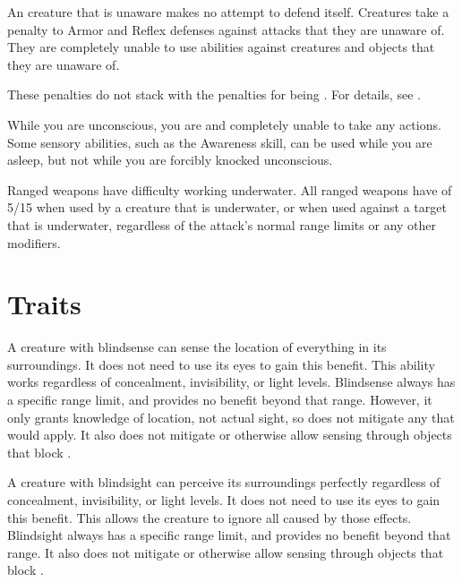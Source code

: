   An creature that is unaware makes no attempt to defend itself.
  Creatures take a  penalty to Armor and Reflex defenses against attacks that they are unaware of.
  They are completely unable to use  abilities against creatures and objects that they are unaware of.

  These penalties do not stack with the penalties for being \partiallyunaware.
  For details, see .

   While you are unconscious, you are \helpless and completely unable to take any actions.
  Some sensory abilities, such as the Awareness skill, can be used while you are asleep, but not while you are forcibly knocked unconscious.

   Ranged weapons have difficulty working underwater.
  All ranged weapons have  of 5/15 when used by a creature that is underwater, or when used against a target that is underwater, regardless of the attack's normal range limits or any other modifiers.

  \newpage
\section{Traits}\label{Traits}

  A creature with blindsense can sense the location of everything in its surroundings.
  It does not need to use its eyes to gain this benefit.
  This ability works regardless of concealment, invisibility, or light levels.
  Blindsense always has a specific range limit, and provides no benefit beyond that range.
  However, it only grants knowledge of location, not actual sight, so does not mitigate any  that would apply.
  It also does not mitigate  or otherwise allow sensing through objects that block .

  A creature with blindsight can perceive its surroundings perfectly regardless of concealment, invisibility, or light levels.
  It does not need to use its eyes to gain this benefit.
  This allows the creature to ignore all  caused by those effects.
  Blindsight always has a specific range limit, and provides no benefit beyond that range.
  It also does not mitigate  or otherwise allow sensing through objects that block .

